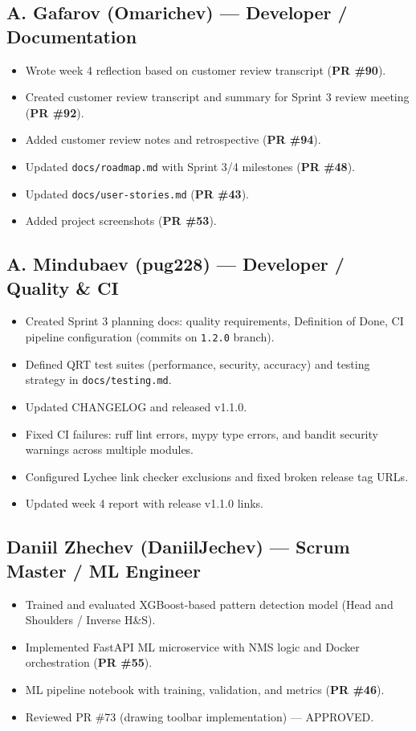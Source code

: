 \documentclass[11pt,a4paper]{article}
\begin{document}
\subsection{A. Gafarov (Omarichev) --- Developer / Documentation}
\begin{itemize}[leftmargin=*]
    \item Wrote week 4 reflection based on customer review transcript (\textbf{PR \#90}).
    \item Created customer review transcript and summary for Sprint 3 review meeting (\textbf{PR \#92}).
    \item Added customer review notes and retrospective (\textbf{PR \#94}).
    \item Updated \texttt{docs/roadmap.md} with Sprint 3/\allowbreak{}4 milestones (\textbf{PR \#48}).
    \item Updated \texttt{docs/user-stories.md} (\textbf{PR \#43}).
    \item Added project screenshots (\textbf{PR \#53}).
\end{itemize}

\subsection{A. Mindubaev (pug228) --- Developer / Quality \& CI}
\begin{itemize}[leftmargin=*]
    \item Created Sprint 3 planning docs: quality requirements, Definition of Done, CI pipeline configuration (commits on \texttt{1.2.0} branch).
    \item Defined QRT test suites (performance, security, accuracy) and testing strategy in \texttt{docs/testing.md}.
    \item Updated CHANGELOG and released v1.1.0.
    \item Fixed CI failures: ruff lint errors, mypy type errors, and bandit security warnings across multiple modules.
    \item Configured Lychee link checker exclusions and fixed broken release tag URLs.
    \item Updated week 4 report with release v1.1.0 links.
\end{itemize}

\subsection{Daniil Zhechev (DaniilJechev) --- Scrum Master / ML Engineer}
\begin{itemize}[leftmargin=*]
    \item Trained and evaluated XGBoost-based pattern detection model (Head and Shoulders / Inverse H\&S).
    \item Implemented FastAPI ML microservice with NMS logic and Docker orchestration (\textbf{PR \#55}).
    \item ML pipeline notebook with training, validation, and metrics (\textbf{PR \#46}).
    \item Reviewed PR \#73 (drawing toolbar implementation) --- APPROVED.
\end{itemize}
\end{document}
